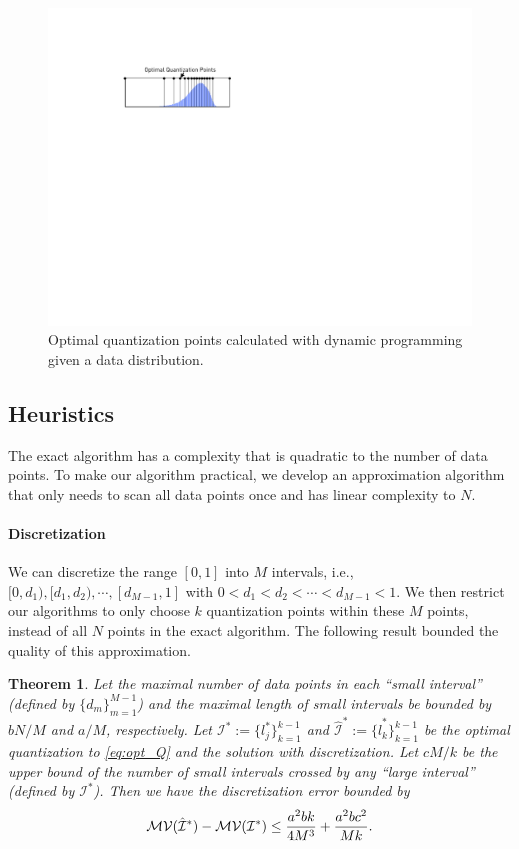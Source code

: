 \documentclass{article}
\newtheorem{theorem}{Theorem}
\begin{document}
\begin{figure}[t]
\centering    
\includegraphics[width=0.5\columnwidth]{micro-experiments/dp-level.pdf} 
\vspace{-1em}
\caption{Optimal quantization points calculated with
dynamic programming given a data distribution. }
\vspace{-1em}
\label{fig:optimalquantization}
\end{figure} 

\vspace{-0.5em}
\subsection{Heuristics}
\vspace{-0.5em}

The exact algorithm has a complexity that is quadratic to the number of data points. To make our algorithm practical,
we develop an approximation algorithm that only needs to scan all data points once and has linear complexity to $N$.

\vspace{-0.5em}
\paragraph*{Discretization}

We can discretize the range $[0,1]$ into $M$ intervals, i.e., $[0,d_1), [d_1, d_2), \cdots, [d_{M-1}, 1]$ with $0< d_1<d_2<\cdots < d_{M-1}<1$. We then restrict our algorithms to only choose $k$ quantization points within these $M$ points, instead of all $N$ points in the exact algorithm. The following result bounded the quality of this approximation.

\begin{theorem} \label{thm:optQ}
Let the maximal number of data points in each ``small interval'' (defined by $\{d_m\}_{m=1}^{M-1}$) and the maximal length of small intervals be bounded by $bN/M$ and $a/M$, respectively. Let ${\mathcal{I}^*} := \{l^*_j\}_{k=1}^{k-1}$ and $\hat{\mathcal{I}}^* :=\{\hat{l}^*_k\}_{k=1}^{k-1}$ be the optimal quantization to \eqref{eq:opt_Q} and the solution with discretization. Let $cM/k$ be the upper bound of the number of small intervals crossed by any ``large interval'' (defined by ${\mathcal{I}}^*$). Then we have the discretization error bounded by
\vspace{-0.5em}
\[
 \mathcal{MV}(\hat{\mathcal{I}}^*) -  \mathcal{MV}({\mathcal{I}}^*) \leq {a^2b k \over 4 M^3} + {a^2bc^2 \over Mk}.
\]
\end{theorem}
\end{document}
